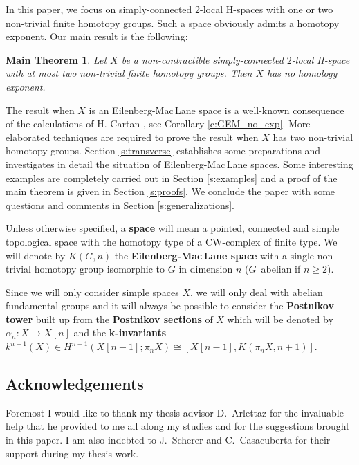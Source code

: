\documentclass{amsart}
\newtheorem*{mainthm*}{Main Theorem}
\theoremstyle{definition}
\theoremstyle{remark}
\renewcommand{\geq}{\geqslant}
\begin{document}
In this paper, we focus on simply-connected $2$-local H-spaces with one or two non-trivial finite homotopy groups. Such a space obviously admits a homotopy exponent. Our main result is the following:

\begin{mainthm*}
Let $X$ be a non-contractible simply-connected $2$-local H-space with at most two non-trivial finite homotopy groups. Then $X$ has no homology exponent.
\end{mainthm*}

The result when $X$ is an Eilenberg-Mac\,Lane space is a well-known consequence of the calculations of H. Cartan \cite{Ca55}, see Corollary \ref{c:GEM_no_exp}. More elaborated techniques are required to prove the result when $X$ has two non-trivial homotopy groups. Section \ref{s:transverse} establishes some preparations and investigates in detail the situation of Eilenberg-Mac\,Lane spaces. Some interesting examples are completely carried out in Section \ref{s:examples} and a proof of the main theorem is given in Section \ref{s:proofs}. We conclude the paper with some questions and comments in Section \ref{s:generalizations}.

Unless otherwise specified, a {\bf space} will mean a pointed, connected and simple topological space with the homotopy type of a CW-complex of finite type. We will denote by $K(G,n)$ the {\bf Eilenberg-Mac\,Lane space} with a single non-trivial homotopy group isomorphic to $G$ in dimension $n$ ($G$~abelian if $n\geq2$). 

\newpage
Since we will only consider simple spaces $X$, we will only deal with abelian fundamental groups and it will always be possible to consider the {\bf Postnikov tower} built up from the {\bf Postnikov sections} of $X$ which will be denoted by $\alpha_n:X\longrightarrow X[n]$ and the {\bf k-invariants} $k^{n+1}(X)\in H^{n+1}(X[n-1];\pi_n X)\cong[X[n-1],K(\pi_n X,n+1)]$.

\subsection*{Acknowledgements}

Foremost I would like to thank my thesis advisor \hbox{D.~Arlettaz} for the invaluable help that he provided to me all along my studies and for the suggestions brought in this paper. I am also indebted to \hbox{J.~Scherer} and \hbox{C.~Casacuberta} for their support during my thesis work.
\end{document}
